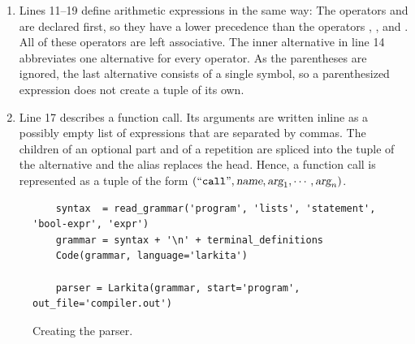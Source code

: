 \begin{enumerate}
      a single symbol.  Therefore, a Boolean expression in parentheses returns the tuple of the expression inside
      the parentheses.
\item Lines 11--19 define arithmetic expressions in the same way:  The operators \quoted{+} and \quoted{-}
      are declared first, so they have a lower precedence than the operators \quoted{*}, \quoted{/}, and
      \quoted{\%}.  All of these operators are left associative.  The inner alternative in line 14 abbreviates one
      alternative for every operator.  As the parentheses are ignored, the last alternative consists of a single
      symbol, so a parenthesized expression does not create a tuple of its own.
\item Line 17 describes a function call.  Its arguments are written inline as a possibly empty list of
      expressions that are separated by commas.  The children of an optional part and of a repetition are spliced
      into the tuple of the alternative and the alias  replaces the head.  Hence, a function call is
      represented as a tuple of the form $(\mbox{``\texttt{call}''}, \textsl{name}, \textsl{arg}_1, \cdots,
      \textsl{arg}_n)$.
\end{enumerate}

\begin{figure}[!ht]
\centering
\begin{verbatim}
    syntax  = read_grammar('program', 'lists', 'statement', 'bool-expr', 'expr')
    grammar = syntax + '\n' + terminal_definitions
    Code(grammar, language='larkita')

    parser = Larkita(grammar, start='program', out_file='compiler.out')
\end{verbatim}
\vspace*{-0.3cm}
\caption{Creating the parser.}
\label{fig:Compiler.ipynb-3}
\end{figure}

